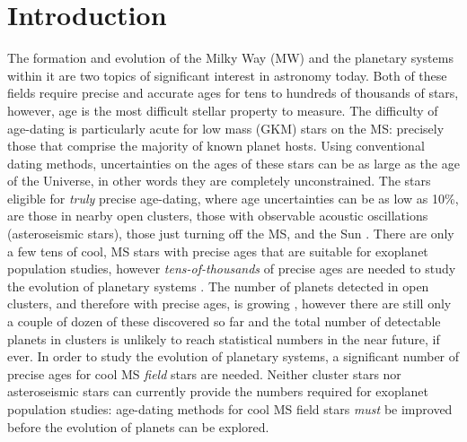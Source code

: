 \section{Introduction}
\label{section:intro}

The formation and evolution of the Milky Way (MW) and the planetary systems
within it are two topics of significant interest in astronomy today.
Both of these fields require precise and accurate ages for tens to hundreds of
thousands of stars, however, age is the most difficult stellar property to
measure.
The difficulty of age-dating is particularly acute for low mass (GKM) stars on
the MS: precisely those that comprise the majority of known planet hosts.
Using conventional dating methods, uncertainties on the ages of these stars
can be as large as the age of the Universe, in other words they are completely
unconstrained.
The stars eligible for {\it truly} precise age-dating, where age uncertainties
can be as low as 10\%, are those in nearby open clusters, those with
observable acoustic oscillations (asteroseismic stars), those just turning off
the MS, and the Sun
\citep[see][for a review of stellar ages]{soderblom2010}.
There are only a few tens of cool, MS stars with precise ages that are
suitable for exoplanet population studies, however {\it tens-of-thousands} of
precise ages are needed to study the evolution of planetary systems
\citep[\eg][]{petigura2013, foreman-mackey2014, veras2015, burke2015}.
The number of planets detected in open clusters, and therefore with precise
ages, is growing \citep[\eg][]{mann2017, rizzuto2018, vanderburg2018,
mann2018}, however there are still only a couple of dozen of these discovered
so far and the total number of detectable planets in clusters is unlikely to
reach statistical numbers in the near future, if ever.
In order to study the evolution of planetary systems, a significant number of
precise ages for cool MS {\it field} stars are needed.
Neither cluster stars nor asteroseismic stars can currently provide the
numbers required for exoplanet population studies: age-dating methods for cool
MS field stars {\it must} be improved before the evolution of planets can be
explored.

